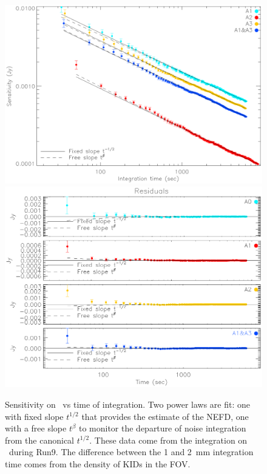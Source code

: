 
\begin{figure}[htpb]
\begin{center}
\includegraphics[clip, angle=0, scale = 0.4]{Figures/HLS_fit.eps}
\includegraphics[clip, angle=0, scale = 0.4]{Figures/HLS_residuals.eps}
\caption{Sensitivity on \hls\ vs time of integration. Two power laws are fit:
  one with fixed slope $t^{1/2}$ that provides the estimate of the NEFD, one
  with a free slope $t^\beta$ to monitor the departure of noise integration from
  the canonical $t^{1/2}$. These data come from the integration on \hls\ during
  Run9. The difference between the 1 and 2~mm integration time comes from the
  density of KIDs in the FOV.}
\label{fig:nefd_vs_t}
\end{center}
\end{figure}

